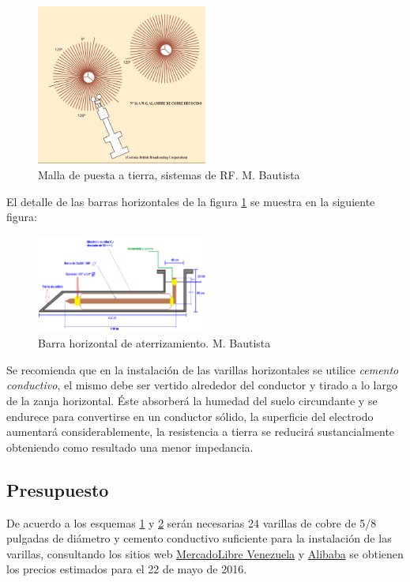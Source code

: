 \documentclass[11pt, a4paper, twosides]{report}
\begin{document}
\begin{figure}[h]
    \centering
    \includegraphics[width=0.5\textwidth]{fig14.png}
    \caption{Malla de puesta a tierra, sistemas de RF. M. Bautista}
    \label{fig:pt}
\end{figure}

El detalle de las barras horizontales de la figura \ref{fig:pt} se muestra en la siguiente figura:

\begin{figure}[h]
    \centering
    \includegraphics[width=0.5\textwidth]{fig15.png}
    \caption{Barra horizontal de aterrizamiento. M. Bautista}
    \label{fig:15}
\end{figure}

Se recomienda que en la instalación de las varillas horizontales se utilice \textit{cemento conductivo}, el mismo debe ser vertido alrededor del conductor y tirado a lo largo de la zanja horizontal. Éste absorberá la humedad del suelo circundante y se endurece para convertirse en un conductor sólido, la superficie del electrodo aumentará considerablemente, la resistencia a tierra se reducirá sustancialmente obteniendo como resultado una menor impedancia.

\subsection{Presupuesto}
De acuerdo a los esquemas \ref{fig:pt} y \ref{fig:15} serán necesarias 24 varillas de cobre de 5/8 pulgadas de diámetro y cemento conductivo suficiente para la instalación de las varillas, consultando los sitios web \href{http://www.mercadolibre.com.ve/}{MercadoLibre Venezuela} y \href{https://www.alibaba.com/}{Alibaba} se obtienen los precios estimados para el 22 de mayo de 2016.
\end{document}
